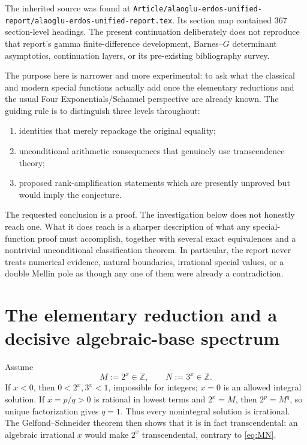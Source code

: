 \documentclass[11pt]{article}
\numberwithin{equation}{section}
\theoremstyle{definition}
\theoremstyle{remark}
\newcommand{\Z}{\mathbb{Z}}
\begin{document}
The inherited source was found at \texttt{Article/alaoglu-erdos-unified-report/alaoglu-erdos-unified-report.tex}.  Its section map contained 367 section-level headings.  The present continuation deliberately does not reproduce that report's gamma finite-difference development, Barnes--$G$ determinant asymptotics, continuation layers, or its pre-existing bibliography survey.

The purpose here is narrower and more experimental: to ask what the classical and modern special functions actually add once the elementary reductions and the usual Four Exponentials/Schanuel perspective are already known.  The guiding rule is to distinguish three levels throughout:
\begin{enumerate}[label=(\roman*)]
\item identities that merely repackage the original equality;
\item unconditional arithmetic consequences that genuinely use transcendence theory;
\item proposed rank-amplification statements which are presently unproved but would imply the conjecture.
\end{enumerate}

The requested conclusion is a proof.  The investigation below does not honestly reach one.  What it does reach is a sharper description of what any special-function proof must accomplish, together with several exact equivalences and a nontrivial unconditional classification theorem.  In particular, the report never treats numerical evidence, natural boundaries, irrational special values, or a double Mellin pole as though any one of them were already a contradiction.

\section{The elementary reduction and a decisive algebraic-base spectrum}
\label{sec:spectrum}

Assume
\begin{equation}
  M:=2^x\in\Z,\qquad N:=3^x\in\Z.
  \label{eq:MN}
\end{equation}
If $x<0$, then $0<2^x,3^x<1$, impossible for integers; $x=0$ is an allowed integral solution.  If $x=p/q>0$ is rational in lowest terms and $2^x=M$, then $2^p=M^q$, so unique factorization gives $q=1$.  Thus every nonintegral solution is irrational.  The Gelfond--Schneider theorem then shows that it is in fact transcendental: an algebraic irrational $x$ would make $2^x$ transcendental, contrary to \eqref{eq:MN}.
\end{document}
